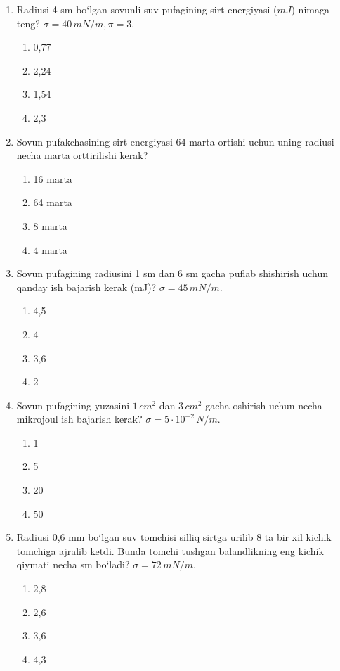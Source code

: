 \begin{enumerate}
\item Radiusi 4 sm bo‘lgan sovunli suv pufagining sirt energiyasi ($mJ$) nimaga teng? $\sigma = 40 \, mN/m, \pi = 3$.
\begin{enumerate}[label=\Alph*)]
\item 0,77
\item 2,24
\item 1,54
\item 2,3
\end{enumerate}

\item Sovun pufakchasining sirt energiyasi 64 marta ortishi uchun uning radiusi necha marta orttirilishi kerak?
\begin{enumerate}[label=\Alph*)]
\item 16 marta
\item 64 marta
\item 8 marta
\item 4 marta
\end{enumerate}

\item Sovun pufagining radiusini 1 sm dan 6 sm gacha puflab shishirish uchun qanday ish bajarish kerak (mJ)? $\sigma = 45 \, mN/m$.
\begin{enumerate}[label=\Alph*)]
\item 4,5
\item 4
\item 3,6
\item 2
\end{enumerate}

\item Sovun pufagining yuzasini $1 \, cm^2$ dan $3 \, cm^2$ gacha oshirish uchun necha mikrojoul ish bajarish kerak? $\sigma = 5 \cdot 10^{-2} \, N/m$.
\begin{enumerate}[label=\Alph*)]
\item 1
\item 5
\item 20
\item 50
\end{enumerate}

\item Radiusi 0,6 mm bo‘lgan suv tomchisi silliq sirtga urilib 8 ta bir xil kichik tomchiga ajralib ketdi. Bunda tomchi tushgan balandlikning eng kichik qiymati necha sm bo‘ladi? $\sigma = 72 \, mN/m$.
\begin{enumerate}[label=\Alph*)]
\item 2,8
\item 2,6
\item 3,6
\item 4,3
\end{enumerate}


\end{enumerate}
